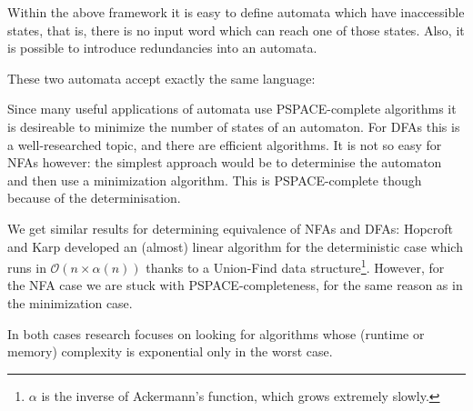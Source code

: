 Within the above framework it is easy to define automata which have inaccessible
states, that is, there is no input word which can reach one of those states.
Also, it is possible to introduce redundancies into an automata.

\begin{example}
  These two automata accept exactly the same language:\\
  \center
\end{example}

Since many useful applications of automata use PSPACE-complete algorithms it
is desireable to minimize the number of states of an automaton.
For DFAs this is a well-researched topic, and there are efficient algorithms.
It is not so easy for NFAs however: the simplest approach would be to
determinise the automaton and then use a minimization algorithm.
This is PSPACE-complete though because of the determinisation.

We get similar results for determining equivalence of NFAs and DFAs:
Hopcroft and Karp developed an (almost) linear algorithm for the deterministic
case which runs in $\mathcal{O}(n \times \alpha(n))$ thanks to a
Union-Find data structure\footnote{$\alpha$ is the inverse of Ackermann's
function, which grows extremely slowly.}.
However, for the NFA case we are stuck with PSPACE-completeness, for the same
reason as in the minimization case.

In both cases research focuses on looking for algorithms whose
(runtime or memory) complexity is exponential only in the worst case.
